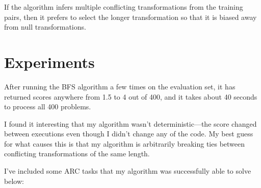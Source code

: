 \documentclass[letterpaper]{article} %
\begin{document}
If the algorithm infers multiple conflicting transformations from the training pairs, then it prefers to select the longer transformation so that it is biased away from null transformations.

\section{Experiments}
After running the BFS algorithm a few times on the evaluation set, it has returned scores anywhere from 1.5 to 4 out of 400, and it takes about 40 seconds to process all 400 problems.

\bigskip

I found it interesting that my algorithm wasn't deterministic---the score changed between executions even though I didn't change any of the code. My best guess for what causes this is that my algorithm is arbitrarily breaking ties between conflicting transformations of the same length.

\bigskip

I've included some ARC tasks that my algorithm was successfully able to solve below:
\end{document}
